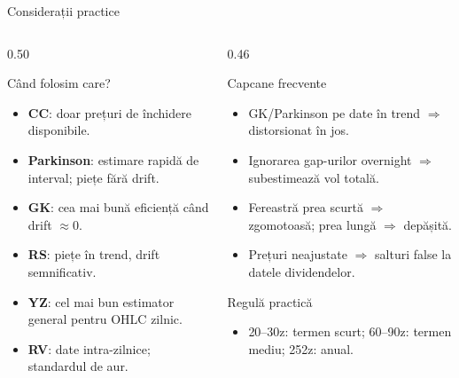 \documentclass[9pt, aspectratio=169, t]{beamer}
\theoremstyle{definition}
\begin{document}
\begin{frame}{Considerații practice}
\begin{columns}[T]
\begin{column}{0.50\textwidth}
\begin{block}{Când folosim care?}
\begin{itemize}
    \item \textbf{CC}: doar prețuri de închidere disponibile.
    \item \textbf{Parkinson}: estimare rapidă de interval; piețe fără drift.
    \item \textbf{GK}: cea mai bună eficiență când drift $\approx 0$.
    \item \textbf{RS}: piețe în trend, drift semnificativ.
    \item \textbf{YZ}: cel mai bun estimator general pentru OHLC zilnic.
    \item \textbf{RV}: date intra-zilnice; standardul de aur.
\end{itemize}
\end{block}
\end{column}
\begin{column}{0.46\textwidth}
\begin{block}{Capcane frecvente}
\begin{itemize}
    \item GK/Parkinson pe date în trend $\Rightarrow$ distorsionat în jos.
    \item Ignorarea gap-urilor overnight $\Rightarrow$ subestimează vol totală.
    \item Fereastră prea scurtă $\Rightarrow$ zgomotoasă; prea lungă $\Rightarrow$ depășită.
    \item Prețuri neajustate $\Rightarrow$ salturi false la datele dividendelor.
\end{itemize}
\end{block}
\begin{alertblock}{Regulă practică}
\begin{itemize}\setlength{\itemsep}{0pt}
    \item 20--30z: termen scurt; 60--90z: termen mediu; 252z: anual.
\end{itemize}
\end{alertblock}
\end{column}
\end{columns}
\end{frame}
\end{document}
